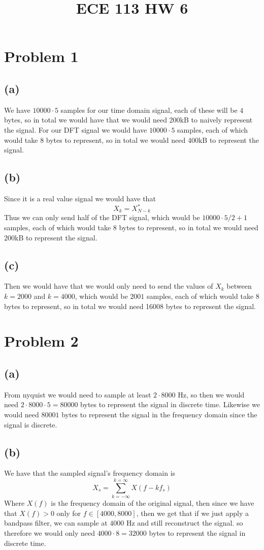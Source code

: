 
\title{ECE 113 HW 6}

\maketitle
\section*{Problem 1}
\subsection*{(a)}
We have $10000\cdot 5$ samples for our 
time domain signal, each of these will be $4$ bytes, 
so in total we would have that we would need 200kB to 
naively represent the signal. For our 
DFT signal we would have $10000 \cdot 5$ samples, each of
which would take $8$ bytes to represent, so in total 
we would need 400kB to represent the signal.
\subsection*{(b)}
Since it is a real value signal we would have that 
$$X_k=X_{N-k}^*$$
Thus we can only send half of the DFT signal,
which would be $10000 \cdot 5/2+1$ samples, each of which
would take $8$ bytes to represent, so in total we would
need 200kB to represent the signal.
\subsection*{(c)}
Then we would have that we would only 
need to send the values of 
$X_k$ between $k=2000$ and $k=4000$, which would be
$2001$ samples, each of which would take $8$ bytes to
represent, so in total we would need 16008 bytes to
represent the signal.
\section*{Problem 2}
\subsection*{(a)}
From nyquist we would need to sample at least $2\cdot 8000$ Hz, 
so then we would need $2\cdot 8000\cdot 5=80000$ bytes to represent
the signal in discrete time. Likewise we would need $80001$ bytes 
to represent the signal in the frequency domain since the signal is discrete.
\subsection*{(b)}
We have that the sampled signal's frequency domain is 
$$X_s=\sum_{k=-\infty}^{k=\infty}X(f-kf_s)$$
Where $X(f)$ is the frequency domain of the original signal, then 
since we have that $X(f)>0$ only for $f\in[4000,8000]$, 
then we get that if we just apply a  bandpass filter, we 
can sample at $4000$ Hz and still reconstruct the signal. so 
therefore we would only need $4000\cdot 8=32000$ bytes to represent
the signal in discrete time.
